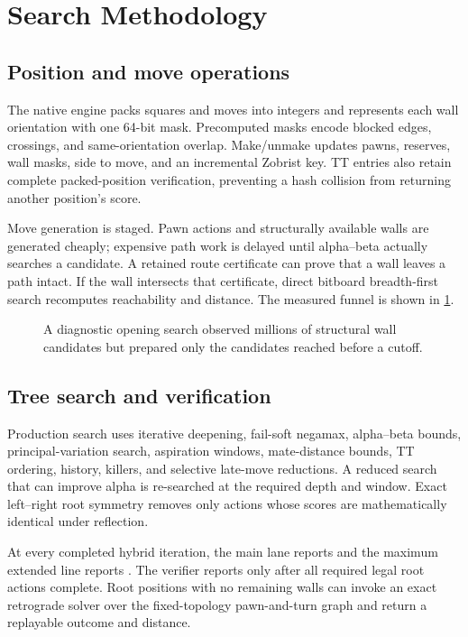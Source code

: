 \section{Search Methodology}
\subsection{Position and move operations}
The native engine packs squares and moves into integers and represents each wall orientation with one 64-bit mask. Precomputed masks encode blocked edges, crossings, and same-orientation overlap. Make/unmake updates pawns, reserves, wall masks, side to move, and an incremental Zobrist key. TT entries also retain complete packed-position verification, preventing a hash collision from returning another position's score.

Move generation is staged. Pawn actions and structurally available walls are generated cheaply; expensive path work is delayed until alpha--beta actually searches a candidate. A retained route certificate can prove that a wall leaves a path intact. If the wall intersects that certificate, direct bitboard breadth-first search recomputes reachability and distance. The measured funnel is shown in \cref{fig:path-funnel}.

\begin{figure}[t]
\centering

\caption{A diagnostic opening search observed millions of structural wall candidates but prepared only the candidates reached before a cutoff.}
\label{fig:path-funnel}
\end{figure}

\subsection{Tree search and verification}
Production search uses iterative deepening, fail-soft negamax, alpha--beta bounds, principal-variation search, aspiration windows, mate-distance bounds, TT ordering, history, killers, and selective late-move reductions. A reduced search that can improve alpha is re-searched at the required depth and window. Exact left--right root symmetry removes only actions whose scores are mathematically identical under reflection.

At every completed hybrid iteration, the main lane reports \mainDepth{} and the maximum extended line reports \selDepth. The verifier reports \verifiedDepth{} only after all required legal root actions complete. Root positions with no remaining walls can invoke an exact retrograde solver over the fixed-topology pawn-and-turn graph and return a replayable outcome and distance.

